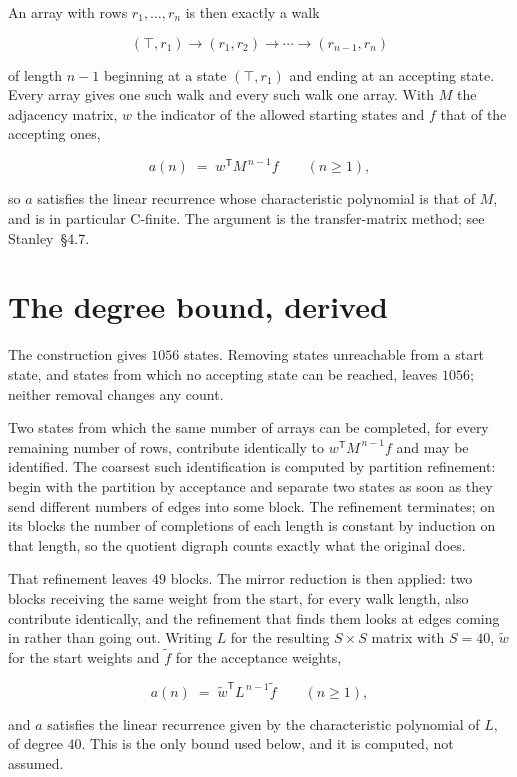 \documentclass[11pt]{article}
\theoremstyle{definition}
\begin{document}
An array with rows $r_1,\dots,r_n$ is then exactly a walk

\[(\top,r_1) \to (r_1,r_2) \to \cdots \to (r_{n-1},r_n)\]

of length $n-1$ beginning at a state $(\top,r_1)$ and ending at an accepting state. Every array gives one such walk and every such walk one array. With $M$ the adjacency matrix, $w$ the indicator of the allowed starting states and $f$ that of the accepting ones,

\[a(n) \;=\; w^{\mathsf T} M^{\,n-1} f \qquad (n \ge 1),\]

so $a$ satisfies the linear recurrence whose characteristic polynomial is that of $M$, and is in particular C-finite. The argument is the transfer-matrix method; see Stanley~\S4.7.

\section{The degree bound, derived}

The construction gives $1056$ states. Removing states unreachable from a start state, and states from which no accepting state can be reached, leaves $1056$; neither removal changes any count.

Two states from which the same number of arrays can be completed, for every remaining number of rows, contribute identically to $w^{\mathsf T}M^{\,n-1}f$ and may be identified. The coarsest such identification is computed by partition refinement: begin with the partition by acceptance and separate two states as soon as they send different numbers of edges into some block. The refinement terminates; on its blocks the number of completions of each length is constant by induction on that length, so the quotient digraph counts exactly what the original does.

That refinement leaves $49$ blocks. The mirror reduction is then applied: two blocks receiving the same weight from the start, for every walk length, also contribute identically, and the refinement that finds them looks at edges coming in rather than going out. Writing $L$ for the resulting $S \times S$ matrix with $S = 40$, $\tilde w$ for the start weights and $\tilde f$ for the acceptance weights,

\[a(n) \;=\; \tilde w^{\mathsf T} L^{\,n-1} \tilde f \qquad (n \ge 1),\]

and $a$ satisfies the linear recurrence given by the characteristic polynomial of $L$, of degree $40$. This is the only bound used below, and it is computed, not assumed.
\end{document}
